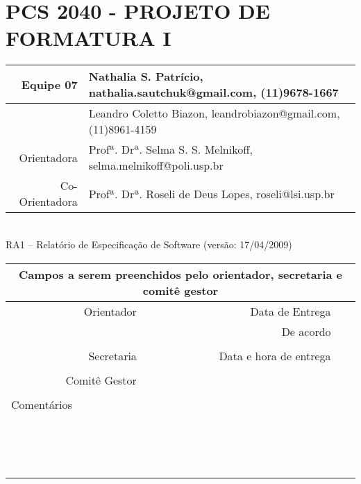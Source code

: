 \documentclass[a4paper,12pt,font=plain,header=plain]{abnt}
\begin{document}
  \capa

	\renewenvironment{center}{}{}
	\section*{PCS 2040 - PROJETO DE FORMATURA I}
	
	\begin{tabular}[|l|]{ |r|l| }
	\hline
				Equipe 07 & Nathalia S. Patrício, nathalia.sautchuk@gmail.com, (11)9678-1667 \\
			\hline
				& Leandro Coletto Biazon, leandrobiazon@gmail.com, (11)8961-4159 \\
			\hline
					Orientadora & Profª. Drª. Selma S. S. Melnikoff, selma.melnikoff@poli.usp.br \\
			\hline
				Co-Orientadora & Profª. Drª. Roseli de Deus Lopes, roseli@lsi.usp.br \\
			\hline
			\end{tabular} \\
	
			RA1 – Relatório de Especificação de Software (versão: 17/04/2009) \\
	
			\begin{tabular}{ |r|r|r| }
	
			\hline
				\multicolumn{3}{|c|}{Campos a serem preenchidos pelo orientador, secretaria e comitê gestor} \\
			\hline
				Orientador & Data de Entrega &  \\
			\hline
				& De acordo &  \\
			\hline
				& &  \\
			\hline
				Secretaria & Data e hora de entrega &  \\
			\hline
				&  &  \\
			\hline
				Comitê Gestor &  &  \\
			\hline
			&  &  \\
			\hline
				\multicolumn{3}{|l|}{Comentários} \\
				\multicolumn{3}{|l|}{} \\
				\multicolumn{3}{|l|}{} \\
				\multicolumn{3}{|l|}{} \\
				\multicolumn{3}{|l|}{} \\
				\multicolumn{3}{|l|}{} \\
				\multicolumn{3}{|l|}{} \\
				\multicolumn{3}{|l|}{} \\
				\multicolumn{3}{|l|}{} \\
				\multicolumn{3}{|l|}{} \\
				\multicolumn{3}{|l|}{} \\
				\multicolumn{3}{|l|}{} \\
				\multicolumn{3}{|l|}{} \\
				\multicolumn{3}{|l|}{} \\
				\multicolumn{3}{|l|}{} \\
				\multicolumn{3}{|l|}{} \\
			\hline
			\end{tabular}
\end{document}
